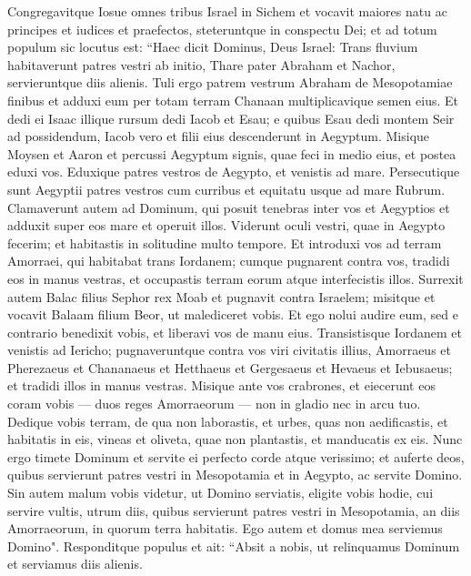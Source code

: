 \begin{biblechapter}  
\verse Congregavitque Iosue omnes tribus Israel in Sichem et vocavit maiores natu ac principes et iudices et praefectos, steteruntque in conspectu Dei; 
\verse et ad totum populum sic locutus est: “Haec dicit Dominus, Deus Israel: Trans fluvium habitaverunt patres vestri ab initio, Thare pater Abraham et Nachor, servieruntque diis alienis. 
\verse Tuli ergo patrem vestrum Abraham de Mesopotamiae finibus et adduxi eum per totam terram Chanaan multiplicavique semen eius. 
\verse Et dedi ei Isaac illique rursum dedi Iacob et Esau; e quibus Esau dedi montem Seir ad possidendum, Iacob vero et filii eius descenderunt in Aegyptum. 
\verse Misique Moysen et Aaron et percussi Aegyptum signis, quae feci in medio eius, et postea eduxi vos. 
\verse Eduxique patres vestros de Aegypto, et venistis ad mare. Persecutique sunt Aegyptii patres vestros cum curribus et equitatu usque ad mare Rubrum. 
\verse Clamaverunt autem ad Dominum, qui posuit tenebras inter vos et Aegyptios et adduxit super eos mare et operuit illos. Viderunt oculi vestri, quae in Aegypto fecerim; et habitastis in solitudine multo tempore. 
\verse Et introduxi vos ad terram Amorraei, qui habitabat trans Iordanem; cumque pugnarent contra vos, tradidi eos in manus vestras, et occupastis terram eorum atque interfecistis illos. 
\verse Surrexit autem Balac filius Sephor rex Moab et pugnavit contra Israelem; misitque et vocavit Balaam filium Beor, ut malediceret vobis. 
\verse Et ego nolui audire eum, sed e contrario benedixit vobis, et liberavi vos de manu eius. 
\verse Transistisque Iordanem et venistis ad Iericho; pugnaveruntque contra vos viri civitatis illius, Amorraeus et Pherezaeus et Chananaeus et Hetthaeus et Gergesaeus et Hevaeus et Iebusaeus; et tradidi illos in manus vestras. 
\verse Misique ante vos crabrones, et eiecerunt eos coram vobis — duos reges Amorraeorum — non in gladio nec in arcu tuo. 
\verse Dedique vobis terram, de qua non laborastis, et urbes, quas non aedificastis, et habitatis in eis, vineas et oliveta, quae non plantastis, et manducatis ex eis. 
\verse Nunc ergo timete Dominum et servite ei perfecto corde atque verissimo; et auferte deos, quibus servierunt patres vestri in Mesopotamia et in Aegypto, ac servite Domino. 
\verse Sin autem malum vobis videtur, ut Domino serviatis, eligite vobis hodie, cui servire vultis, utrum diis, quibus servierunt patres vestri in Mesopotamia, an diis Amorraeorum, in quorum terra habitatis. Ego autem et domus mea serviemus Domino". 
\verse Responditque populus et ait: “Absit a nobis, ut relinquamus Dominum et serviamus diis alienis. 

\end{biblechapter}
